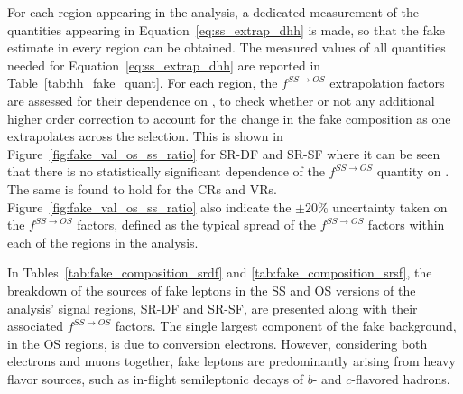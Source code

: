 For each region appearing in the analysis, a dedicated measurement of the quantities appearing in
Equation~\ref{eq:ss_extrap_dhh} is made, so that the fake estimate in every region can be obtained.
The measured values of all quantities needed for Equation~\ref{eq:ss_extrap_dhh} are reported
in Table~\ref{tab:hh_fake_quant}.
For each region, the $f^{SS \rightarrow OS}$ extrapolation factors are assessed for their dependence on
\dhh, to check whether or not any additional higher order correction to account for the change in the fake
composition as one extrapolates across the \dhh selection.
This is shown in Figure~\ref{fig:fake_val_os_ss_ratio} for SR-DF and SR-SF where it can be seen that there
is no statistically significant dependence of the $f^{SS \rightarrow OS}$ quantity on \dhh.
The same is found to hold for the CRs and VRs.
Figure~\ref{fig:fake_val_os_ss_ratio} also indicate the $\pm 20\%$ uncertainty taken on the $f^{SS \rightarrow OS}$
factors, defined as the typical spread of the $f^{SS \rightarrow OS}$ factors within each of the regions in 
the analysis.

In Tables~\ref{tab:fake_composition_srdf} and \ref{tab:fake_composition_srsf}, the breakdown of the sources
of fake leptons in the SS and OS versions of the analysis' signal regions, SR-DF and SR-SF, are presented
along with their associated $f^{SS \rightarrow OS}$ factors.
The single largest component of the fake background, in the OS regions, is due to conversion electrons.
However, considering both electrons and muons together, fake leptons are predominantly arising from
heavy flavor sources, such as in-flight semileptonic decays of $b$- and $c$-flavored hadrons.

